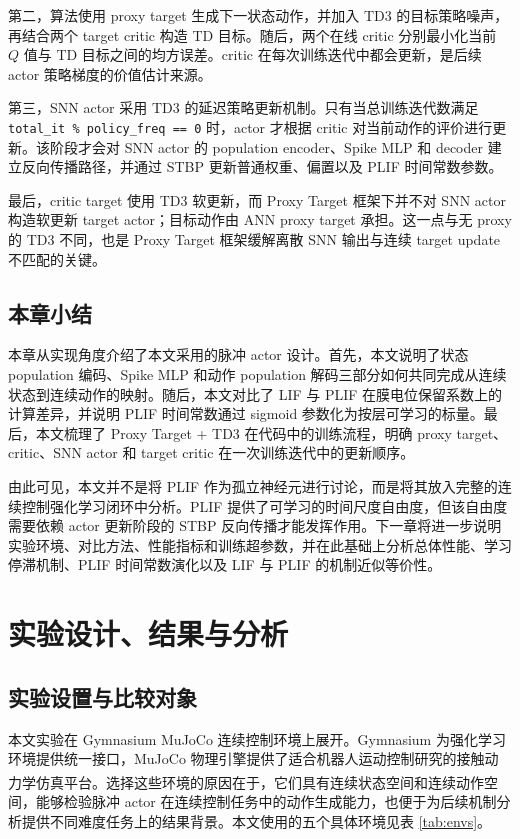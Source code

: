 \documentclass[UTF8,zihao=-4,oneside,openany]{ctexbook}
\let\oldcite\cite
\renewcommand{\cite}[1]{\textsuperscript{\oldcite{#1}}}
\begin{document}
第二，算法使用 proxy target 生成下一状态动作，并加入 TD3 的目标策略噪声，再结合两个 target critic 构造 TD 目标。随后，两个在线 critic 分别最小化当前 $Q$ 值与 TD 目标之间的均方误差。critic 在每次训练迭代中都会更新，是后续 actor 策略梯度的价值估计来源。

第三，SNN actor 采用 TD3 的延迟策略更新机制。只有当总训练迭代数满足 \texttt{total\_it \% policy\_freq == 0} 时，actor 才根据 critic 对当前动作的评价进行更新。该阶段才会对 SNN actor 的 population encoder、Spike MLP 和 decoder 建立反向传播路径，并通过 STBP 更新普通权重、偏置以及 PLIF 时间常数参数。

最后，critic target 使用 TD3 软更新，而 Proxy Target 框架下并不对 SNN actor 构造软更新 target actor；目标动作由 ANN proxy target 承担。这一点与无 proxy 的 TD3 不同，也是 Proxy Target 框架缓解离散 SNN 输出与连续 target update 不匹配的关键。

\section{本章小结}
本章从实现角度介绍了本文采用的脉冲 actor 设计。首先，本文说明了状态 population 编码、Spike MLP 和动作 population 解码三部分如何共同完成从连续状态到连续动作的映射。随后，本文对比了 LIF 与 PLIF 在膜电位保留系数上的计算差异，并说明 PLIF 时间常数通过 sigmoid 参数化为按层可学习的标量。最后，本文梳理了 Proxy Target + TD3 在代码中的训练流程，明确 proxy target、critic、SNN actor 和 target critic 在一次训练迭代中的更新顺序。

由此可见，本文并不是将 PLIF 作为孤立神经元进行讨论，而是将其放入完整的连续控制强化学习闭环中分析。PLIF 提供了可学习的时间尺度自由度，但该自由度需要依赖 actor 更新阶段的 STBP 反向传播才能发挥作用。下一章将进一步说明实验环境、对比方法、性能指标和训练超参数，并在此基础上分析总体性能、学习停滞机制、PLIF 时间常数演化以及 LIF 与 PLIF 的机制近似等价性。

\chapter{实验设计、结果与分析}

\section{实验设置与比较对象}
本文实验在 Gymnasium MuJoCo 连续控制环境上展开。Gymnasium 为强化学习环境提供统一接口，MuJoCo 物理引擎提供了适合机器人运动控制研究的接触动力学仿真平台\cite{towers2024gymnasium,todorov2012mujoco}。选择这些环境的原因在于，它们具有连续状态空间和连续动作空间，能够检验脉冲 actor 在连续控制任务中的动作生成能力，也便于为后续机制分析提供不同难度任务上的结果背景。本文使用的五个具体环境见表 \ref{tab:envs}。
\end{document}
